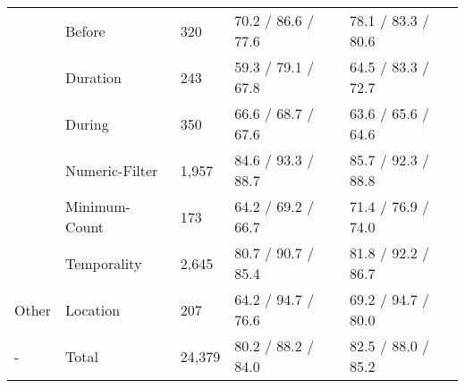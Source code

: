 \begin{tabular}{m{3cm} m{3cm} m{2cm} m{3cm} m{3.7cm}}
     &                       Before & 320 & 70.2 / 86.6 / 77.6 & 78.1 / 83.3 / 80.6 \\
     &                       Duration & 243 & 59.3 / 79.1 / 67.8 & 64.5 / 83.3 / 72.7 \\
     &                       During & 350 & 66.6 / 68.7 / 67.6 & 63.6 / 65.6 / 64.6 \\
     &                       Numeric-Filter & 1,957 & 84.6 / 93.3 / 88.7 & 85.7 / 92.3 / 88.8 \\
     &                       Minimum-Count & 173 & 64.2 / 69.2 / 66.7 & 71.4 / 76.9 / 74.0 \\
     &                       Temporality & 2,645 & 80.7 / 90.7 / 85.4 & 81.8 / 92.2 / 86.7 \\
    \hline
    Other &                  Location & 207 & 64.2 / 94.7 / 76.6 & 69.2 / 94.7 / 80.0 \\
    \hline
    - & Total & 24,379 & 80.2 / 88.2 / 84.0 & 82.5 / 88.0 / 85.2
\end{tabular}